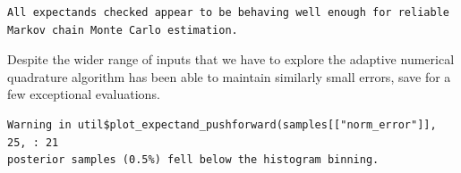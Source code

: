 \documentclass[
  letterpaper,
  DIV=11,
  numbers=noendperiod]{scrartcl}
\newenvironment{Shaded}{\begin{snugshade}}{\end{snugshade}}
\newcommand{\AttributeTok}[1]{\textcolor[rgb]{0.40,0.45,0.13}{#1}}
\newcommand{\DecValTok}[1]{\textcolor[rgb]{0.68,0.00,0.00}{#1}}
\newcommand{\FloatTok}[1]{\textcolor[rgb]{0.68,0.00,0.00}{#1}}
\newcommand{\FunctionTok}[1]{\textcolor[rgb]{0.28,0.35,0.67}{#1}}
\newcommand{\NormalTok}[1]{\textcolor[rgb]{0.00,0.23,0.31}{#1}}
\newcommand{\OtherTok}[1]{\textcolor[rgb]{0.00,0.23,0.31}{#1}}
\newcommand{\SpecialCharTok}[1]{\textcolor[rgb]{0.37,0.37,0.37}{#1}}
\newcommand{\StringTok}[1]{\textcolor[rgb]{0.13,0.47,0.30}{#1}}
\begin{document}
\begin{Shaded}
\end{Shaded}

\begin{verbatim}
All expectands checked appear to be behaving well enough for reliable
Markov chain Monte Carlo estimation.
\end{verbatim}

Despite the wider range of inputs that we have to explore the adaptive
numerical quadrature algorithm has been able to maintain similarly small
errors, save for a few exceptional evaluations.

\begin{Shaded}
\end{Shaded}

\begin{verbatim}
Warning in util$plot_expectand_pushforward(samples[["norm_error"]], 25, : 21
posterior samples (0.5%) fell below the histogram binning.
\end{verbatim}
\end{document}
